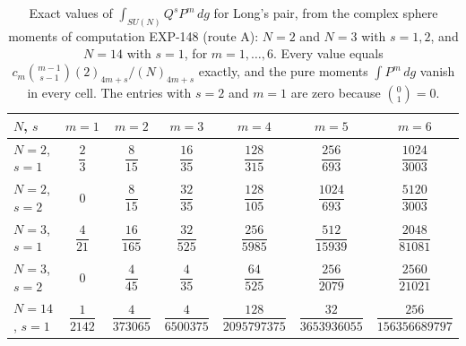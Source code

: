 \begin{table}[t]
\centering\footnotesize
\setlength{\tabcolsep}{5pt}
\renewcommand{\arraystretch}{2.2}
\begin{tabular}{@{}lcccccc@{}}
\toprule
$N$, $s$ & $m=1$ & $m=2$ & $m=3$ & $m=4$ & $m=5$ & $m=6$ \\
\midrule
$N=2$, $s=1$ & $\dfrac{2}{3}$ & $\dfrac{8}{15}$ & $\dfrac{16}{35}$ & $\dfrac{128}{315}$ & $\dfrac{256}{693}$ & $\dfrac{1024}{3003}$ \\[2pt]
$N=2$, $s=2$ & $0$ & $\dfrac{8}{15}$ & $\dfrac{32}{35}$ & $\dfrac{128}{105}$ & $\dfrac{1024}{693}$ & $\dfrac{5120}{3003}$ \\[2pt]
$N=3$, $s=1$ & $\dfrac{4}{21}$ & $\dfrac{16}{165}$ & $\dfrac{32}{525}$ & $\dfrac{256}{5985}$ & $\dfrac{512}{15939}$ & $\dfrac{2048}{81081}$ \\[2pt]
$N=3$, $s=2$ & $0$ & $\dfrac{4}{45}$ & $\dfrac{4}{35}$ & $\dfrac{64}{525}$ & $\dfrac{256}{2079}$ & $\dfrac{2560}{21021}$ \\[2pt]
$N=14$, $s=1$ & $\dfrac{1}{2142}$ & $\dfrac{4}{373065}$ & $\dfrac{4}{6500375}$ & $\dfrac{128}{2095797375}$ & $\dfrac{32}{3653936055}$ & $\dfrac{256}{156356689797}$ \\[2pt]
\bottomrule
\end{tabular}
\caption{Exact values of $\int_{SU(N)}Q^sP^m\,dg$ for Long's pair, from the complex sphere moments of computation EXP-148 (route A): $N=2$ and $N=3$ with $s=1,2$, and $N=14$ with $s=1$, for $m=1,\dots,6$. Every value equals $c_m\binom{m-1}{s-1}(2)_{4m+s}/(N)_{4m+s}$ exactly, and the pure moments $\int P^m\,dg$ vanish in every cell. The entries with $s=2$ and $m=1$ are zero because $\binom{0}{1}=0$.}
\label{tab:mathieu}
\end{table}
